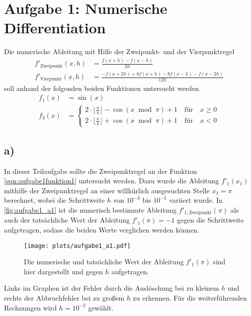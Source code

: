 \newpage
\section{Aufgabe 1: Numerische Differentiation}
  \label{sec:auf1}
  Die numerische Ableitung mit Hilfe der Zweipunkt- und der Vierpunktregel
  \begin{align}
    f'_{\mathrm{Zweipunkt}}(x,h) &= \frac{f(x+h) - f(x-h)}{2h} \\[10pt]
    f'_{\mathrm{Vierpunkt}}(x,h) &= \frac{-f(x+2h) + 8f(x+h) - 8f(x-h) - f(x-2h)}{12h}
  \end{align}
  soll anhand der folgenden beiden Funktionen untersucht werden.
  \begin{align}
    \label{eqn:aufgabe1funktion1}
    f_1(x) &= \sin(x)\\[2pt]
    \label{eqn:aufgabe1funktion2}
    f_2(x) &= \left\{
      \begin{matrix}
        2\cdot \lfloor\frac{x}{\pi} \rfloor -\cos(x \;\;\text{mod}\;\; \pi) + 1 \quad \text{für} \quad x \geq 0 \\[5pt]
        2\cdot \lfloor\frac{x}{\pi} \rfloor +\cos(x \;\;\text{mod}\;\; \pi) + 1 \quad \text{für} \quad x < 0
      \end{matrix}
      \right.
  \end{align}

  \subsection{a)}
    In dieser Teilaufgabe sollte die Zweipunktregel an der Funktion \ref{eqn:aufgabe1funktion1} untersucht werden.
    Dazu wurde die Ableitung $f'_1(x_1)$ mithilfe der Zweipunktregel an einer willkürlich ausgesuchten Stelle $x_1 = \pi$ berechnet, wobei die Schrittweite $h$ von $10^{-3}$ bis $10^{-1}$ variiert wurde.
    In \autoref{fig:aufgabe1_a1} ist die numerisch bestimmte Ableitung $f'_{\mathrm{1,Zweipunkt}}(\pi)$ als auch der tatsächliche Wert der Ableitung $f'_1(\pi) = -1$ gegen die Schrittweite aufgetragen, sodass die beiden Werte verglichen werden können.
    
    \begin{figure}[ht]
      \center
      \texttt{[image: plots/aufgabe1\_a1.pdf]}
      \caption{Die numerische und tatsächliche Wert der Ableitung $f'_1(\pi)$ sind hier dargestellt und gegen $h$ aufgetragen.}
      \label{fig:aufgabe1_a1}
    \end{figure}

    Links im Graphen ist der Fehler durch die Auslöschung bei zu kleinem $h$ und rechts der Abbruchfehler bei zu großem $h$ zu erkennen.
    Für die weiterführenden Rechnungen wird $h = 10^{-2}$ gewählt.

